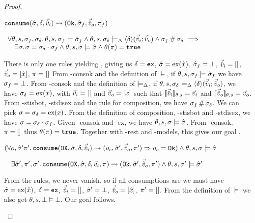 \begin{proof}
\pfassume \begin{hypvlist}
 $\texttt{consume}(\hat{\sigma},\delta,\vec{\hat{v}}_i)\rightsquigarrow (\texttt{Ok},\hat{\sigma}_f,\vec{\hat{v}}_o,\pi_f)$
\end{hypvlist}
\pfprove \begin{goalvlist}
 $\begin{array}{l}
\forall \theta,s,\sigma_f,\sigma_\delta\ldotp \theta,s,\sigma_f\models \hat{\sigma}_f \land \theta, s, \sigma_\delta \models_{\Delta} \left<\delta\right>\!(\vec{\hat{v}}_i;\vec{\hat{v}}_o) \land \sigma_f\operatorname{\#}\sigma_\delta \implies \\
\quad \exists \sigma\ldotp \sigma = \sigma_\delta \cdot \sigma_f \land \theta,s,\sigma\models \hat{\sigma} \land \theta(\pi)=\texttt{true}
\end{array}$
\end{goalvlist}
\begin{hypvlist}
 There is only one \consume{} rules yielding \Ok, giving us $\delta=\texttt{ex}$, $\hat{\sigma}=\text{ex}(\hat{x})$, $\hat{\sigma}_f=\bot$, $\vec{\hat{v}}_i=[]$, $\vec{\hat{v}}_o=[\hat{x}]$, $\pi=[]$
 From \hyp{consok} and the definition of $\models$, if $\theta,s,\sigma_f\models\hat{\sigma}_f$ we have $\sigma_f=\bot$.
 From \hyp{consok} and the definition of $\models_{\Delta}$, if $\theta,s,\sigma_\delta\models_{\Delta}\left<\delta\right>\!(\vec{\hat{v}}_i;\vec{\hat{v}}_o)$, we have $\sigma_\delta=\text{ex}(x)$, with $\vec{v}_i=[]$ and $\vec{v}_o=[x]$ such that $\llbracket\vec{\hat{v}}_i\rrbracket_{\theta,s}=\vec{v}_i$ and $\llbracket\vec{\hat{v}}_o\rrbracket_{\theta,s}=\vec{v}_o$.
 From \hyp{stisbot}, \hyp{stdisex} and the rule for composition, we have $\sigma_f\operatorname{\#}\sigma_\delta$.
 We can pick $\sigma=\sigma_\delta=\text{ex}(x)$.
 From the definition of composition, \hyp{stisbot} and \hyp{stdisex}, we have $\sigma=\sigma_\delta\cdot\sigma_f$.
 Given \hyp{consok} and \hyp{ex}, we have $\theta,s,\sigma\models\hat{\sigma}$.
 From \hyp{consok}, $\pi=[]$ thus $\theta(\pi)=\texttt{true}$. Together with \hyp{rest} and \hyp{models}, this gives our goal .
\end{hypvlist}


\pfassume \begin{hypvlist}
 $(\forall o, \hat{\sigma}'\pi'\ldotp \texttt{consume}(\texttt{OX},\hat{\sigma},\delta,\vec{\hat{v}}_i)\rightsquigarrow (o_c, \hat{\sigma}', \vec{\hat{v}}_o, \pi')\Rightarrow o_c = \texttt{Ok})\land \theta, s, \sigma \models \hat{\sigma}$
\end{hypvlist}
\pfprove \begin{goalvlist}
 $\quad \exists  \hat{\sigma}', \pi', \sigma'\ldotp \texttt{consume}(\texttt{OX}, \hat{\sigma}, \delta,\vec{v}_i,\pi)\rightsquigarrow (\texttt{Ok}, \hat{\sigma}', \vec{\hat{v}}_o, \pi') \land \theta,s,\sigma' \models \hat{\sigma}'$
\end{goalvlist}
\begin{hypvlist}
 From the \consume{} rules, we never vanish, so if all consumptions are \Ok{} we must have $\hat{\sigma}=\text{ex}(\hat{x})$, $\delta=\texttt{ex}$, $\vec{\hat{v}}_i=[]$, $\hat{\sigma}'=\bot$, $\vec{\hat{v}}_o=[\hat{x}]$, $\pi'=[]$.
 From the definition of $\models$ we also get $\theta,s,\bot\models\bot$. Our goal  follows.
\end{hypvlist}


\end{proof}
